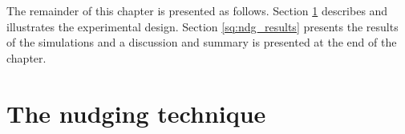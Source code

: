 The remainder of this chapter is presented as follows. Section \ref{sq:nudg_technique} describes and illustrates the experimental design. Section \ref{sq:ndg_results} presents the results of the simulations and a discussion and summary is presented at the end of the chapter.


\section{The nudging technique}
\label{sq:nudg_technique}
%



%
%
%
%


